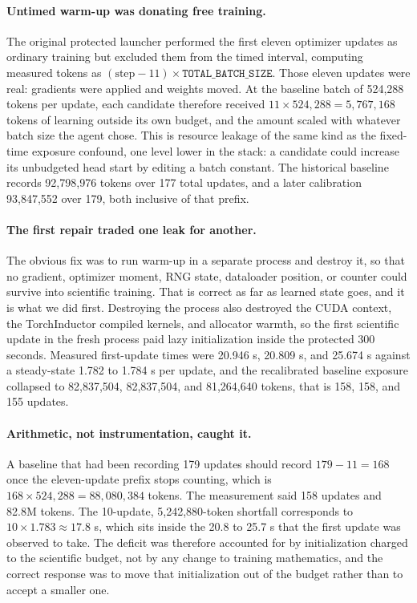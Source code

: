 \documentclass{article}
\begin{document}
\paragraph{Untimed warm-up was donating free training.} The original protected launcher performed the first eleven optimizer updates as ordinary training but excluded them from the timed interval, computing measured tokens as $(\text{step}-11)\times\texttt{TOTAL\_BATCH\_SIZE}$. Those eleven updates were real: gradients were applied and weights moved. At the baseline batch of 524,288 tokens per update, each candidate therefore received $11\times524{,}288=5{,}767{,}168$ tokens of learning outside its own budget, and the amount scaled with whatever batch size the agent chose. This is resource leakage of the same kind as the fixed-time exposure confound, one level lower in the stack: a candidate could increase its unbudgeted head start by editing a batch constant. The historical baseline records 92,798,976 tokens over 177 total updates, and a later calibration 93,847,552 over 179, both inclusive of that prefix.

\paragraph{The first repair traded one leak for another.} The obvious fix was to run warm-up in a separate process and destroy it, so that no gradient, optimizer moment, RNG state, dataloader position, or counter could survive into scientific training. That is correct as far as learned state goes, and it is what we did first. Destroying the process also destroyed the CUDA context, the TorchInductor compiled kernels, and allocator warmth, so the first scientific update in the fresh process paid lazy initialization inside the protected 300 seconds. Measured first-update times were 20.946 s, 20.809 s, and 25.674 s against a steady-state 1.782 to 1.784 s per update, and the recalibrated baseline exposure collapsed to 82,837,504, 82,837,504, and 81,264,640 tokens, that is 158, 158, and 155 updates.

\paragraph{Arithmetic, not instrumentation, caught it.} A baseline that had been recording 179 updates should record $179-11=168$ once the eleven-update prefix stops counting, which is $168\times524{,}288=88{,}080{,}384$ tokens. The measurement said 158 updates and 82.8M tokens. The 10-update, 5,242,880-token shortfall corresponds to $10\times1.783\approx17.8$ s, which sits inside the 20.8 to 25.7 s that the first update was observed to take. The deficit was therefore accounted for by initialization charged to the scientific budget, not by any change to training mathematics, and the correct response was to move that initialization out of the budget rather than to accept a smaller one.
\end{document}
